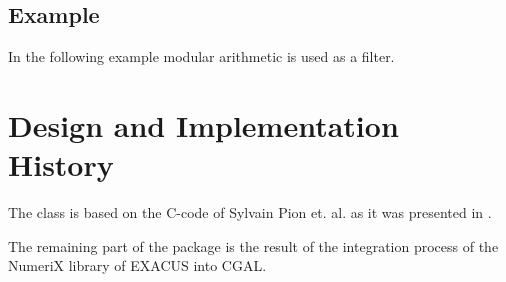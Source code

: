 \subsection{Example}

In the following example modular arithmetic is used as a filter. 

\section{Design and Implementation History}

The class  is based on the C-code of Sylvain Pion et. al. 
as it was presented in \cite{bepp-sdrns-99}. 

The remaining part of the package is the result of the integration process
of the NumeriX library of EXACUS \cite{beh+-eeeafcs-05} into CGAL. 

